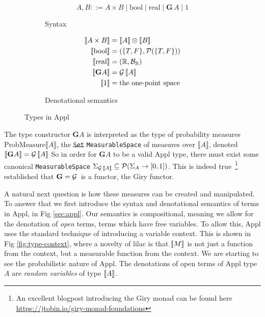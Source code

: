 \begin{figure}[tb]
  \centering
  \begin{subfigure}[t]{0.95\linewidth}
    \centering
\[ 
A, B ::= A \times B \mid \mathrm{bool} \mid \mathrm{real} \mid \mathbf{G}\,A \mid 1
\]
    \caption{Syntax}
    \label{fig:type-syntax}
  \end{subfigure}

  \begin{subfigure}[t]{0.95\linewidth}
    \centering
\[
\begin{aligned}
\llbracket A \times B \rrbracket &= \llbracket A \rrbracket \otimes \llbracket B \rrbracket \\
\llbracket \mathrm{bool} \rrbracket &= (\{T,F\}, \mathcal{P}(\{T,F\})) \\
\llbracket \mathrm{real} \rrbracket &= (\mathbb{R}, \mathcal{B}_\mathbb{R}) \\
\llbracket \mathbf{G} A \rrbracket &= \mathcal{G}\,\llbracket A \rrbracket \\
\llbracket 1 \rrbracket &= \text{the one-point space}
\end{aligned}
\]
    \caption{Denotational semantics}
    \label{fig:type-denotations}
  \end{subfigure}
  \caption{Types in Appl}
\end{figure}

The type constructor $\mathbf{G} A$
is interpreted as the type of probability measures $\text{ProbMeasure} \llbracket A \rrbracket$, the
\sout{\texttt{Set}} \texttt{MeasurableSpace} of measures over $\llbracket A \rrbracket$, denoted $\llbracket \mathbf{G} A \rrbracket = \mathcal{G}\, \llbracket A \rrbracket$ So in order for $\mathbf{G} A$ to be a valid Appl type, there must
exist some canonical \texttt{MeasurableSpace} $\Sigma_{\mathcal{G}\, \llbracket A \rrbracket} \subseteq \mathcal{P}(\Sigma_A \rightarrow [0, 1])$. This is indeed 
true~\citep{giry}\footnote{An excellent blogpost introducing the Giry monad can be found here \url{https://jtobin.io/giry-monad-foundations}}
established that $\mathbf{G} = \mathcal{G}\,$ is a functor, the Giry functor.

A natural next question is how these measures can be created and manipulated. To answer that we first introduce the syntax and denotational semantics of terms in Appl, in Fig \ref{sec:appl}.
Our semantics is compositional, meaning we allow for the denotation of \emph{open} terms, terms which have free variables. To allow this, Appl uses the standard technique of
introducing a variable context. This is shown in Fig \ref{fig:type-context}, where a novelty of lilac is that $\llbracket M \rrbracket$ is not just a function from the context, but a measurable
function from the context. We are starting to see the probabilistic nature of Appl. The denotations of open terms of Appl type $A$ are \emph{random variables} of type $\llbracket A \rrbracket$.

